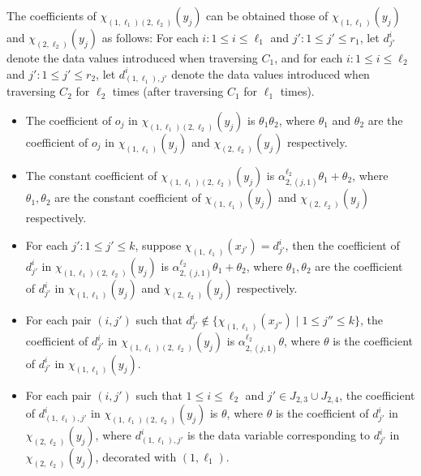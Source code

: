 The coefficients of $\chi_{(1,\ell_1)(2,\ell_2)}(y_j)$ can be obtained those of $\chi_{(1,\ell_1)}(y_j)$ and $\chi_{(2,\ell_2)}(y_j)$ as follows: For each $i: 1 \le i \le \ell_1$ and $j': 1 \le j' \le r_1$, let $d^i_{j'}$ denote the data values introduced when traversing $C_1$, and for each  $i: 1 \le i \le \ell_2$ and $j': 1 \le j' \le r_2$, let $d^{i}_{(1, \ell_1),j'}$ denote the data values introduced when traversing $C_2$ for $\ell_2$ times (after traversing $C_1$ for $\ell_1$ times).
\begin{itemize}
\item The coefficient of $o_j$ in $\chi_{(1,\ell_1)(2,\ell_2)}(y_j)$ is $\theta_1\theta_2$, where $\theta_1$ and $\theta_2$ are the coefficient of $o_j$ in $\chi_{(1,\ell_1)}(y_j)$ and $\chi_{(2,\ell_2)}(y_j)$ respectively.
%
\item The constant coefficient of $\chi_{(1,\ell_1)(2,\ell_2)}(y_j)$ is $\alpha^{\ell_2}_{2,(j,1)} \theta_1 + \theta_2$, where $\theta_1,\theta_2$ are the constant coefficient of $\chi_{(1,\ell_1)}(y_j)$ and $\chi_{(2,\ell_2)}(y_j)$ respectively.
%
\item For each $j': 1 \le j' \le k$, suppose $\chi_{(1,\ell_1)}(x_{j'})=d^{i}_{j'}$, then the coefficient of $d^{i}_{j'}$ in $\chi_{(1,\ell_1)(2,\ell_2)}(y_j)$ is $\alpha^{\ell_2}_{2,(j,1)} \theta_1 + \theta_2$, where $\theta_1,\theta_2$ are the  coefficient of $d^i_{j'}$ in $\chi_{(1,\ell_1)}(y_j)$ and $\chi_{(2,\ell_2)}(y_j)$ respectively.  
%
%
\item For each pair $(i,j')$ such that $d^i_{j'} \not \in \{\chi_{(1,\ell_1)}(x_{j''}) \mid 1 \le j'' \le k\}$, the coefficient of $d^{i}_{j'}$ in $\chi_{(1,\ell_1)(2,\ell_2)}(y_j)$ is $\alpha^{\ell_2}_{2,(j,1)} \theta$, where $\theta$ is the  coefficient of $d^{i}_{j'}$ in $\chi_{(1,\ell_1)}(y_j)$.
%
\item For each pair $(i,j')$ such that $1 \le i \le \ell_2$ and $j' \in J_{2,3} \cup J_{2,4}$, the coefficient of $d^{i}_{(1, \ell_1),j'}$ in $\chi_{(1,\ell_1)(2,\ell_2)}(y_j)$ is $\theta$, where $\theta$ is the  coefficient of $d^{i}_{j'}$ in $\chi_{(2,\ell_2)}(y_j)$, where $d^{i}_{(1, \ell_1),j'}$ is the data variable corresponding to $d^{i}_{j'}$ in $\chi_{(2,\ell_2)}(y_j)$, decorated with $(1,\ell_1)$.
\end{itemize}



